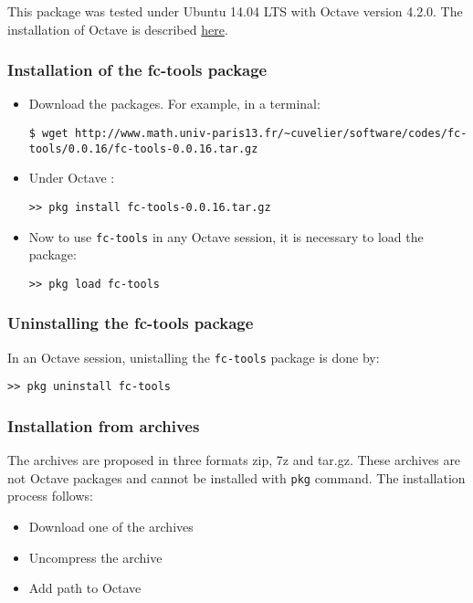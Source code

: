 This package was tested under Ubuntu 14.04 LTS with Octave version 4.2.0. The installation of Octave is described 
\href{http://www.math.univ-paris13.fr/~cuvelier/Octave.html}{here}.

\subsubsection{Installation of the fc-tools package}

\begin{itemize}
\item Download the packages. For example, in a terminal:
\begin{verbatim}
$ wget http://www.math.univ-paris13.fr/~cuvelier/software/codes/fc-tools/0.0.16/fc-tools-0.0.16.tar.gz
\end{verbatim}
\item Under Octave :
\begin{verbatim}
>> pkg install fc-tools-0.0.16.tar.gz
\end{verbatim}
\item Now to use \texttt{fc-tools} in any Octave session, it is necessary to load the package:
\begin{verbatim}
>> pkg load fc-tools
\end{verbatim}
\end{itemize}

\subsubsection{Uninstalling the fc-tools package}
In an Octave session, unistalling the \texttt{fc-tools} package is done by:
\begin{verbatim}
>> pkg uninstall fc-tools
\end{verbatim}

\subsubsection{Installation from archives}
The archives are proposed in three formats zip, 7z and tar.gz. These archives are not Octave packages and cannot be installed with \texttt{pkg} command.
The installation process follows:
\begin{itemize}
\item Download one of the archives
\item Uncompress the archive
\item Add path to Octave
\end{itemize}

